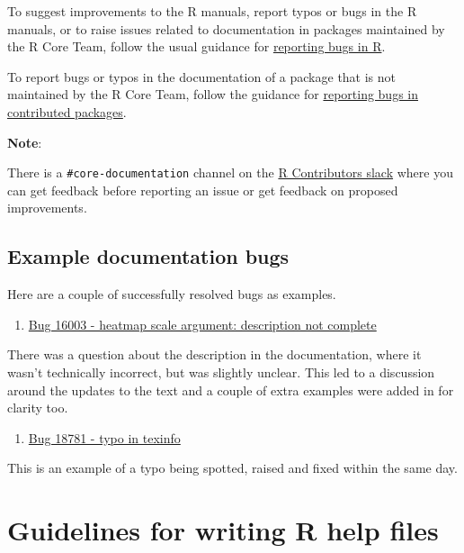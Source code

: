 \documentclass[
  letterpaper,
  DIV=11,
  numbers=noendperiod]{scrreprt}
\providecommand{\tightlist}{%
  \setlength{\itemsep}{0pt}\setlength{\parskip}{0pt}}\usepackage{longtable,booktabs,array}
\begin{document}
To suggest improvements to the R manuals, report typos or bugs in the R
manuals, or to raise issues related to documentation in packages
maintained by the R Core Team, follow the usual guidance for
\hyperref[RCorePkgBug]{reporting bugs in R}.

To report bugs or typos in the documentation of a package that is not
maintained by the R Core Team, follow the guidance for
\hyperref[nonRCorePkgBug]{reporting bugs in contributed packages}.

\textbf{Note}:

There is a \texttt{\#core-documentation} channel on the
\href{https://r-contributors.slack.com/}{R Contributors slack} where you
can get feedback before reporting an issue or get feedback on proposed
improvements.

\subsection{Example documentation
bugs}\label{example-documentation-bugs}

Here are a couple of successfully resolved bugs as examples.

\begin{enumerate}
\def\labelenumi{\arabic{enumi}.}
\tightlist
\item
  \href{https://bugs.r-project.org/show_bug.cgi?id=16003}{Bug 16003 -
  heatmap scale argument: description not complete}
\end{enumerate}

There was a question about the description in the documentation, where
it wasn't technically incorrect, but was slightly unclear. This led to a
discussion around the updates to the text and a couple of extra examples
were added in for clarity too.

\begin{enumerate}
\def\labelenumi{\arabic{enumi}.}
\setcounter{enumi}{1}
\tightlist
\item
  \href{https://bugs.r-project.org/show_bug.cgi?id=18781}{Bug 18781 -
  typo in texinfo}
\end{enumerate}

This is an example of a typo being spotted, raised and fixed within the
same day.

\section{Guidelines for writing R help
files}\label{guidelines-for-writing-r-help-files}
\end{document}
